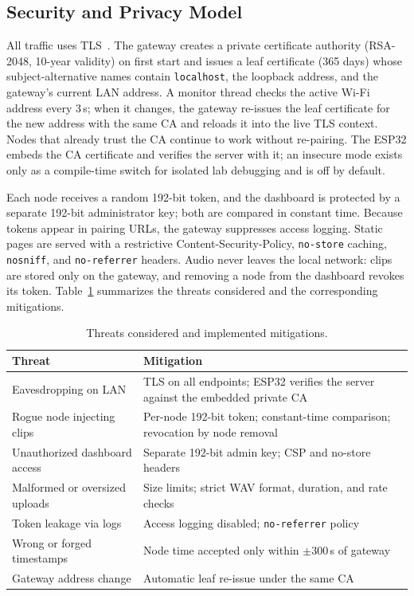\documentclass[conference]{IEEEtran}
\begin{document}
\subsection{Security and Privacy Model}
All traffic uses TLS~\cite{rfc8446}. The gateway creates a private certificate authority (RSA-2048, 10-year validity) on first start and issues a leaf certificate (365 days) whose subject-alternative names contain \texttt{localhost}, the loopback address, and the gateway's current LAN address. A monitor thread checks the active Wi-Fi address every 3\,s; when it changes, the gateway re-issues the leaf certificate for the new address with the same CA and reloads it into the live TLS context. Nodes that already trust the CA continue to work without re-pairing. The ESP32 embeds the CA certificate and verifies the server with it; an insecure mode exists only as a compile-time switch for isolated lab debugging and is off by default.

Each node receives a random 192-bit token, and the dashboard is protected by a separate 192-bit administrator key; both are compared in constant time. Because tokens appear in pairing URLs, the gateway suppresses access logging. Static pages are served with a restrictive Content-Security-Policy, \texttt{no-store} caching, \texttt{nosniff}, and \texttt{no-referrer} headers. Audio never leaves the local network: clips are stored only on the gateway, and removing a node from the dashboard revokes its token. Table~\ref{tab:threats} summarizes the threats considered and the corresponding mitigations.

\begin{table}[!t]
\centering
\caption{Threats considered and implemented mitigations.}
\label{tab:threats}
\renewcommand{\arraystretch}{1.08}
\footnotesize
\setlength{\tabcolsep}{4pt}
\begin{tabular}{@{}p{2.7cm}p{5.2cm}@{}}
\toprule
\textbf{Threat} & \textbf{Mitigation} \\
\midrule
Eavesdropping on LAN & TLS on all endpoints; ESP32 verifies the server against the embedded private CA \\
Rogue node injecting clips & Per-node 192-bit token; constant-time comparison; revocation by node removal \\
Unauthorized dashboard access & Separate 192-bit admin key; CSP and no-store headers \\
Malformed or oversized uploads & Size limits; strict WAV format, duration, and rate checks \\
Token leakage via logs & Access logging disabled; \texttt{no-referrer} policy \\
Wrong or forged timestamps & Node time accepted only within $\pm300$\,s of gateway \\
Gateway address change & Automatic leaf re-issue under the same CA \\
\bottomrule
\end{tabular}
\end{table}
\end{document}
